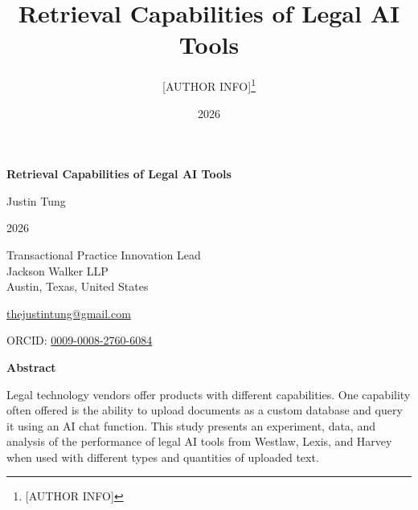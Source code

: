 \documentclass[
]{article}
\title{Retrieval Capabilities of Legal AI Tools}
\author{{[}AUTHOR INFO{]}\footnote{{[}AUTHOR INFO{]}}}
\date{2026}
\begin{document}
\begin{titlepage}
\thispagestyle{empty}


\begin{center}

{\LARGE\bfseries
Retrieval Capabilities of Legal AI Tools
\par}

\vspace{0.17in}

{\large Justin Tung\par}

\vspace{0.04in}

{2026\par}

\vspace{0.18in}

{\small
Transactional Practice Innovation Lead\\
Jackson Walker LLP\\
Austin, Texas, United States
\par}

\vspace{0.09in}

{\small
\href{mailto:thejustintung@gmail.com}
     {thejustintung@gmail.com}
\par}

\vspace{0.025in}

{\small
ORCID:
\href{https://orcid.org/0009-0008-2760-6084}
     {0009-0008-2760-6084}
\par}

\end{center}

\vspace{0.16in}

\noindent
{\large\bfseries Abstract}

\vspace{0.035in}

\begin{footnotesize}

\setlength{\parindent}{0pt}
\setlength{\parskip}{0.24em}

Legal technology vendors offer products with different capabilities. One capability often offered is the ability to upload documents as a custom database and query it using an AI chat function. This study presents an experiment, data, and analysis of the performance of legal AI tools from Westlaw, Lexis, and Harvey when used with different types and quantities of uploaded text.


\end{footnotesize}
\end{titlepage}
\end{document}
